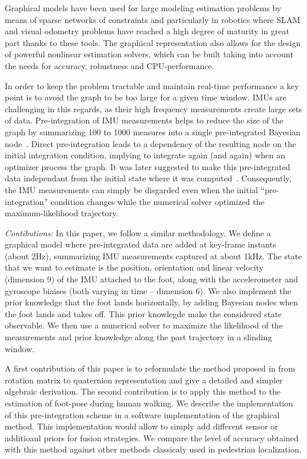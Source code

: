 Graphical models have been used for large modeling estimation problems by means of sparse networks of constraints and particularly in
robotics where SLAM and visual odometry problems have reached a high degree of maturity in great part thanks to these tools.
The graphical representation also allows for the design of powerful nonlinear estimation solvers, which can be built taking into account the needs for accuracy, 
robustness and CPU-performance.

In order to keep the problem tractable and maintain real-time performance a key point is to avoid the graph to be too large for a given time window.
IMUs are challenging in this regards, as their high frequency measurements create large sets of data. 
Pre-integration of IMU measurements helps to reduce the size of the graph by summarizing 100 to 1000 measures into a single pre-integrated Bayesian node~\cite{LUPTON-09}.
Direct pre-integration leads to a dependency of the resulting node on the initial integration condition, implying to integrate again (and again) when an optimizer process the graph.
It was later suggested to make this pre-integrated data independant from the initial state where it was computed~\cite{forster2015imu}.
Consequently, the IMU measurements can simply be disgarded even when the initial ``pre-integration'' condition changes while the numerical solver optimized the maximum-likelihood trajectory.

\textit{Contibutions: }
In this paper, we follow a similar methodology. We define a graphical model where pre-integrated data are added at key-frame instants (about 2Hz), summarizing IMU measurements captured at about 1kHz.
The state that we want to estimate is the position, orientation and linear velocity (dimension 9) of the IMU attached to the foot, along with the accelerometer and gyroscope biaises (both varying in time -- dimension 6).
We also implement the prior knowledge that the foot lands horizontally, by adding Bayesian nodes when the foot lands and takes off.
This prior knowlegde make the considered state observable. 
We then use a numerical solver to maximize the likelihood of the measurements and prior knowledge along the past trajectory in a slinding window. 

A first contribution of this paper is to reformulate the method proposed in \cite{forster2015imu} from rotation matrix to quaternion representation
and give a detailed and simpler algebraic derivation.
The second contribution is to apply this method to the estimation of foot-pose during human walking.
We describe the implementation of this pre-integration scheme in a software implementation of the graphical method. This implementation would allow to simply add different sensor or additioanl priors for fusion strategies.
We compare the level of accuracy obtained with this method against other methods classicaly used in pedestrian localization.

